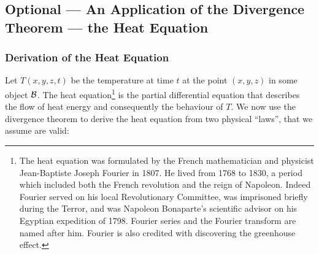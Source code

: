 \subsection{Optional --- An Application of the Divergence Theorem --- the Heat Equation}  \label{sec:heatEqn}

\subsubsection{Derivation of the Heat Equation}

Let $T(x,y,z,t)$ be the temperature at time $t$ at the point $(x,y,z)$
in some object $\mathcal{B}$. The heat equation\footnote{The heat equation was 
formulated by the French mathematician and physicist Jean-Baptiste 
Joseph Fourier in 1807. He lived from 1768 to 1830, a period which 
included both the French revolution and the reign of Napoleon. Indeed 
Fourier served on his local Revolutionary Committee, was imprisoned 
briefly during the Terror, and was Napoleon Bonaparte's scientific 
advisor on his Egyptian expedition of 1798. Fourier series and 
the Fourier transform are named after him. Fourier is also credited 
with discovering the greenhouse effect.}  
is the partial differential equation 
that describes the flow of heat energy and consequently the behaviour of
$T$. We now use the divergence theorem to derive the heat 
equation
from two physical ``laws'', that we assume are valid:
